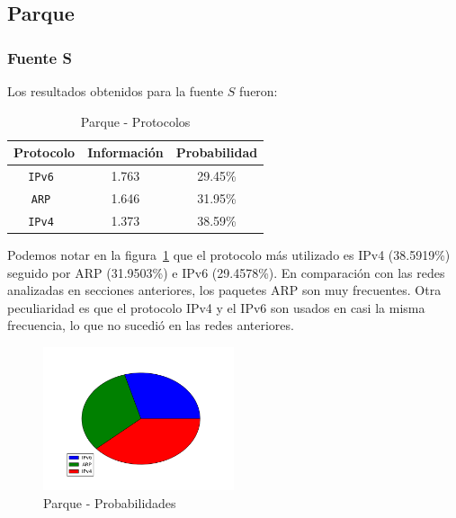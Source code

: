 \documentclass[final,inline,narroweqnarray,a4paper]{ieee}
\begin{document}


\subsection{Parque}
\subsubsection{Fuente S}

Los resultados obtenidos para la fuente $S$ fueron:

\begin{table}[H]
    \begin{center}
        \begin{tabular}{|c|c|c|}
            \hline
            \textbf{Protocolo} & \textbf{Información} & \textbf{Probabilidad} \\ \hline
            \texttt{IPv6      }& 1.763        & 29.45\%    \\ \hline
            \texttt{ARP       }& 1.646        & 31.95\%     \\ \hline
            \texttt{IPv4      }& 1.373        & 38.59\%    \\ \hline
        \end{tabular}
        \caption{Parque - Protocolos}
        \label{table:parqueS}
    \end{center}
\end{table} 

Podemos notar en la figura~\ref{torta:parqueS} que el protocolo más utilizado es IPv4 (38.5919\%) seguido por ARP (31.9503\%) e IPv6 (29.4578\%). En comparación con las redes analizadas en secciones anteriores, los paquetes ARP son muy frecuentes. Otra peculiaridad es que el protocolo IPv4 y el IPv6 son usados en casi la misma frecuencia, lo que no sucedió en las redes anteriores.

\begin{figure}[H]
    \begin{center}
        \includegraphics[width=0.5\textwidth]{plot/parqueS-pie.png}
        \caption{Parque - Probabilidades}
        \label{torta:parqueS}
    \end{center}
\end{figure}
\end{document}
